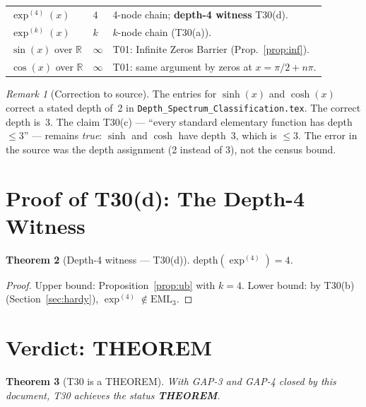 \documentclass[12pt,a4paper]{article}
\newtheorem{theorem}{Theorem}[section]
\theoremstyle{definition}
\theoremstyle{remark}
\newtheorem{remark}[theorem]{Remark}
\begin{document}
\begin{longtable}{@{}llp{8cm}@{}}
$\exp^{(4)}(x)$
  & $4$
  & 4-node chain; \textbf{depth-4 witness} T30(d). \\[2pt]

$\exp^{(k)}(x)$
  & $k$
  & $k$-node chain (T30(a)). \\[4pt]

$\sin(x)$ over $\mathbb{R}$
  & $\infty$
  & T01: Infinite Zeros Barrier (Prop.~\ref{prop:inf}). \\[2pt]

$\cos(x)$ over $\mathbb{R}$
  & $\infty$
  & T01: same argument by zeros at $x=\pi/2 + n\pi$. \\

\end{longtable}

\begin{remark}[Correction to source]
The entries for $\sinh(x)$ and $\cosh(x)$ correct a stated depth of~2 in
\texttt{Depth\_Spectrum\_Classification.tex}.  The correct depth is~3.
The claim T30(c) --- ``every standard elementary function has depth $\leq 3$'' ---
remains \emph{true}: $\sinh$ and $\cosh$ have depth~3, which is $\leq 3$.
The error in the source was the depth assignment (2 instead of 3), not the census bound.
\end{remark}

\section{Proof of T30(d): The Depth-4 Witness}

\begin{theorem}[Depth-4 witness --- T30(d)]\label{thm:d4}
$\mathrm{depth}(\exp^{(4)}) = 4$.
\end{theorem}
\begin{proof}
Upper bound: Proposition~\ref{prop:ub} with $k=4$.
Lower bound: by T30(b) (Section~\ref{sec:hardy}), $\exp^{(4)} \notin \mathrm{EML}_3$.
\end{proof}

\section{Verdict: THEOREM}

\begin{theorem}[T30 is a THEOREM]\label{thm:verdict}
With GAP-3 and GAP-4 closed by this document, T30 achieves the status
\textcolor{verdictgreen}{\textbf{THEOREM}}.
\end{theorem}
\end{document}
